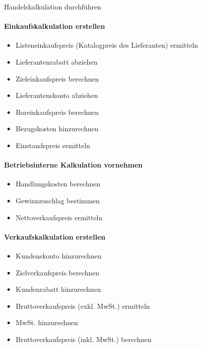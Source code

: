 \begin{KR}{Handelskalkulation durchführen}\\
\paragraph{Einkaufskalkulation erstellen}
\begin{itemize}
    \item Listeneinkaufspreis (Katalogpreis des Lieferanten) ermitteln
    \item Lieferantenrabatt abziehen
    \item Zieleinkaufspreis berechnen
    \item Lieferantenskonto abziehen
    \item Bareinkaufspreis berechnen
    \item Bezugskosten hinzurechnen
    \item Einstandspreis ermitteln
\end{itemize}

\paragraph{Betriebsinterne Kalkulation vornehmen}
\begin{itemize}
    \item Handlungskosten berechnen
    \item Gewinnzuschlag bestimmen
    \item Nettoverkaufspreis ermitteln
\end{itemize}

\paragraph{Verkaufskalkulation erstellen}
\begin{itemize}
    \item Kundenskonto hinzurechnen
    \item Zielverkaufspreis berechnen
    \item Kundenrabatt hinzurechnen
    \item Bruttoverkaufspreis (exkl. MwSt.) ermitteln
    \item MwSt. hinzurechnen
    \item Bruttoverkaufspreis (inkl. MwSt.) berechnen
\end{itemize}
\end{KR}
